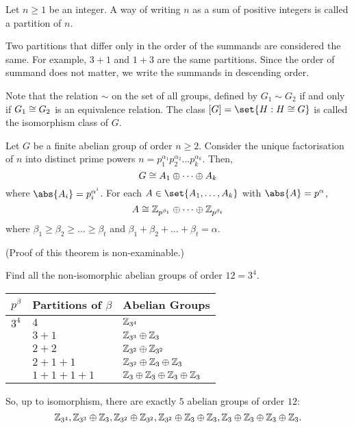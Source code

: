 \documentclass[11pt]{penrose}
\begin{document}
\begin{ndfn}
    Let $n \geq 1$ be an integer. A way of writing $n$ as a sum of positive integers is called a partition of $n$.
\end{ndfn}

Two partitions that differ only in the order of the summands are considered the same. For example, $3+1$ and $1+3$ are the same partitions. Since the order of summand does not matter, we write the summands in descending order.

Note that the relation $\sim$ on the set of all groups, defined by $G_{1} \sim G_{2}$ if and only if $G_{1} \mathrel{\cong} G_{2}$ is an equivalence relation. The class $[G] = \set{H : H \isom G}$ is called the isomorphism class of $G$.

\begin{nthm}
    Let $G$ be a finite abelian group of order $n \geq 2$. Consider the unique factorisation of $n$ into distinct prime powers $n = p_{1}^{\alpha_{1}} p_{2}^{\alpha_{2}} \dots p_{k}^{\alpha_{k}}$. Then,
    \begin{equation*}
        G \mathrel{\cong} A_{1} \oplus \dots \oplus A_{k}
    \end{equation*}
    where $\abs{A_{i}} = p_{i}^{\alpha^{i}}$. For each $A \in \set{A_{1}, \dots, A_{k}}$ with $\abs{A} = p^{\alpha}$,
    \begin{equation*}
        A \mathrel{\cong} \mathbb{Z}_{p^{\beta_{1}}} \oplus \dots \oplus \mathbb{Z}_{p^{\beta_{t}}}
    \end{equation*}
    where $\beta_{1} \geq \beta_{2} \geq \dots \geq \beta_{t}$ and $\beta_{1} + \beta_{2} + \dots + \beta_{t} = \alpha$.
\end{nthm}
(Proof of this theorem is non-examinable.)

\begin{negg}
    Find all the non-isomorphic abelian groups of order $12 = 3^{4}$.
    \begin{center}
        \begin{tabularx}{0.66\textwidth}{p{8mm}XX}
            \toprule
            $p^{\beta}$ & Partitions of $\beta$ & Abelian Groups\\
            \midrule
            $3^{4}$ & $4$ & $\mathbb{Z}_{3^{4}}$ \\
                    & $3+1$ & $\mathbb{Z}_{3^{3}} \oplus \mathbb{Z}_{3}$ \\
                    & $2+2$ & $\mathbb{Z}_{3^{2}} \oplus \mathbb{Z}_{3^{2}}$ \\
                    & $2+1+1$ & $\mathbb{Z}_{3^{2}} \oplus \mathbb{Z}_{3} \oplus \mathbb{Z}_{3}$ \\
                    & $1+1+1+1$ & $\mathbb{Z}_{3} \oplus \mathbb{Z}_{3} \oplus \mathbb{Z}_{3} \oplus \mathbb{Z}_{3}$ \\
            \bottomrule
        \end{tabularx}
    \end{center}
    So, up to isomorphism, there are exactly $5$ abelian groups of order $12$:
    \begin{equation*}
        \mathbb{Z}_{3^{4}}, \mathbb{Z}_{3^{3}} \oplus \mathbb{Z}_{3}, \mathbb{Z}_{3^{2}} \oplus \mathbb{Z}_{3^{2}}, \mathbb{Z}_{3^{2}} \oplus \mathbb{Z}_{3} \oplus \mathbb{Z}_{3}, \mathbb{Z}_{3} \oplus \mathbb{Z}_{3} \oplus \mathbb{Z}_{3} \oplus \mathbb{Z}_{3}.
    \end{equation*}
\end{negg}
\end{document}
